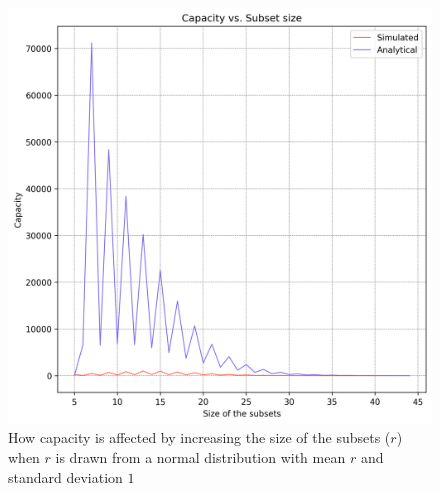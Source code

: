 \begin{figure}%
    \centering
    \includegraphics[scale=0.83]{figures/cap-vs-r-bounded.png}
    \caption[Capacity vs. Size of the subsets ($r$)]{How capacity is affected by increasing the size of the subsets ($r$) when $r$ is drawn from a normal distribution with mean $r$ and standard deviation $1$}
    \label{figure:cap-vs-r-bounded}
    \end{figure}

